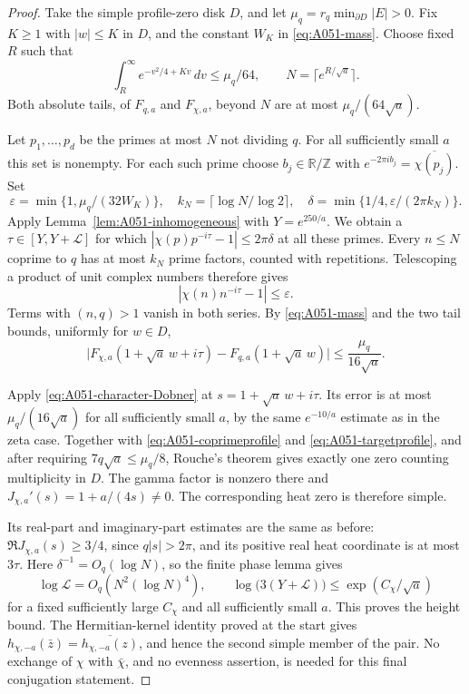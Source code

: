 \begin{proof}
Take the simple profile-zero disk \(D\), and let
\(\mu_q=r_q\min_{\partial D}|E|>0\).
Fix \(K\ge1\) with \(|w|\le K\) in \(D\), and the constant
\(W_K\) in \eqref{eq:A051-mass}.
Choose fixed \(R\) such that
\[
           \int_R^\infty e^{-v^2/4+Kv}\,dv\le\mu_q/64,
 \qquad N=\lceil e^{R/\sqrt a}\rceil.
\]
Both absolute tails, of \(F_{q,a}\) and \(F_{\chi,a}\), beyond
\(N\) are at most \(\mu_q/(64\sqrt a)\).

Let \(p_1,\ldots,p_d\) be the primes at most \(N\) not dividing
\(q\). For all sufficiently small \(a\) this set is nonempty.
For each such prime choose \(b_j\in\mathbb R/\mathbb Z\) with
\(e^{-2\pi i b_j}=\overline{\chi(p_j)}\).
Set
\[
 \varepsilon=\min\{1,\mu_q/(32W_K)\},\quad
 k_N=\lceil\log N/\log2\rceil,\quad
 \delta=\min\{1/4,\varepsilon/(2\pi k_N)\}.
\]
Apply Lemma~\ref{lem:A051-inhomogeneous} with
\(Y=e^{250/a}\). We obtain a \(\tau\in[Y,Y+\mathcal L]\) for
which \(|\chi(p)p^{-i\tau}-1|\le2\pi\delta\) at all these primes.
Every \(n\le N\) coprime to \(q\) has at most \(k_N\) prime
factors, counted with repetitions. Telescoping a product of unit
complex numbers therefore gives
\[
                  |\chi(n)n^{-i\tau}-1|\le\varepsilon.
\]
Terms with \((n,q)>1\) vanish in both series. By
\eqref{eq:A051-mass} and the two tail bounds, uniformly for \(w\in D\),
\begin{equation}\label{eq:A051-targetprofile}
 \big|F_{\chi,a}(1+\sqrt a\,w+i\tau)
             -F_{q,a}(1+\sqrt a\,w)\big|
                            \le\frac{\mu_q}{16\sqrt a}.
\end{equation}

Apply \eqref{eq:A051-character-Dobner} at
\(s=1+\sqrt a\,w+i\tau\).
Its error is at most \(\mu_q/(16\sqrt a)\) for all sufficiently
small \(a\), by the same \(e^{-10/a}\) estimate as in the zeta case.
Together with \eqref{eq:A051-coprimeprofile} and
\eqref{eq:A051-targetprofile}, and after requiring
\(7q\sqrt a\le\mu_q/8\), Rouche's theorem gives exactly one zero
counting multiplicity in \(D\).
The gamma factor is nonzero there and
\(J_{\chi,a}'(s)=1+a/(4s)\ne0\). The corresponding heat zero is
therefore simple.

Its real-part and imaginary-part estimates are the same as before:
\(\Re J_{\chi,a}(s)\ge3/4\), since \(q|s|>2\pi\), and its
positive real heat coordinate is at most \(3\tau\).
Here \(\delta^{-1}=O_q(\log N)\), so the finite phase lemma gives
\[
 \log\mathcal L=O_q(N^2(\log N)^4),\qquad
 \log\bigl(3(Y+\mathcal L)\bigr)
           \le\exp(C_\chi/\sqrt a)
\]
for a fixed sufficiently large \(C_\chi\) and all sufficiently
small \(a\). This proves the height bound.
The Hermitian-kernel identity proved at the start gives
\(h_{\chi,-a}(\bar z)=\overline{h_{\chi,-a}(z)}\), and hence the
second simple member of the pair. No exchange of \(\chi\) with
\(\bar\chi\), and no evenness assertion, is needed for this final
conjugation statement.
\end{proof}

